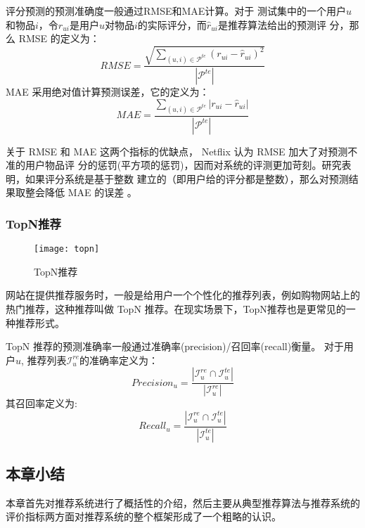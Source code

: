 评分预测的预测准确度一般通过RMSE和MAE计算。对于
测试集中的一个用户$u$和物品$i$，令$r_{ui}$是用户$u$对物品$i$的实际评分，而$\hat{r}_{ui}$是推荐算法给出的预测评
分，那么 RMSE 的定义为：
\begin{equation*}
RMSE = \frac
{\sqrt{{\sum_{\left(u,i\right) \in \mathcal{P}^{te}} \left(r_{ui} - \hat{r}_{ui}\right)^2}}} {|\mathcal{P}^{te}|}
\end{equation*}
MAE 采用绝对值计算预测误差，它的定义为：
\begin{equation*}
MAE = \frac{{\sum_{\left(u,i\right) \in \mathcal{P}^{te}}} |r_{ui} - \hat{r}_{ui}|}
	{|\mathcal{P}^{te}|}
\end{equation*}

关于 RMSE 和 MAE 这两个指标的优缺点， Netflix 认为 RMSE 加大了对预测不准的用户物品评
分的惩罚(平方项的惩罚)，因而对系统的评测更加苛刻。研究表明，如果评分系统是基于整数
建立的（即用户给的评分都是整数），那么对预测结果取整会降低 MAE 的误差
。


\subsubsection{TopN推荐}
\begin{figure}[htbp]
	
	\label{gra2}
	\begin{center}
		\texttt{[image: topn]}
		\caption{TopN推荐}
	\end{center}
\end{figure}
网站在提供推荐服务时，一般是给用户一个个性化的推荐列表，例如购物网站上的热门推荐，这种推荐叫做 TopN 推荐。在现实场景下，TopN推荐也是更常见的一种推荐形式。

TopN 推荐的预测准确率一般通过准确率(precision)/召回率(recall)衡量。
对于用户$u$, 推荐列表$\mathcal{I}_u^{re}$的准确率定义为：
\begin{equation*}
Precision_u = \frac{|\mathcal{I}_u^{re} \cap \mathcal{I}_u^{te}|}{|\mathcal{I}_u^{re}|}
\end{equation*}
其召回率定义为:
\begin{equation*}
Recall_u = \frac{|\mathcal{I}_u^{re} \cap \mathcal{I}_u^{te}|}{|\mathcal{I}_u^{te}|}
\end{equation*}




\subsection{本章小结}
本章首先对推荐系统进行了概括性的介绍，然后主要从典型推荐算法与推荐系统的评价指标两方面对推荐系统的整个框架形成了一个粗略的认识。